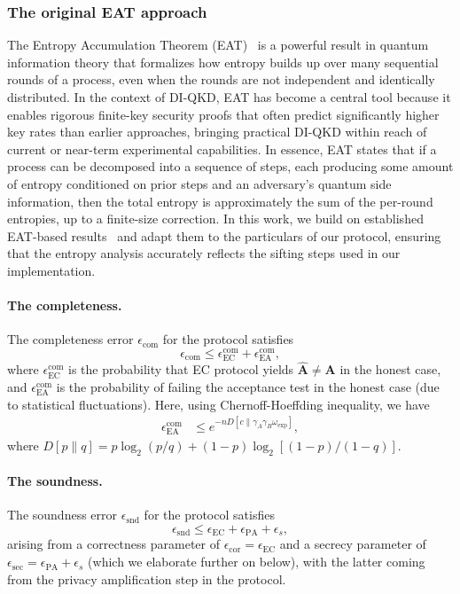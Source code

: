 \documentclass[aps,reprint,showpacs,superscriptaddress]{revtex4-2}
\begin{document}
\subsubsection{The original EAT approach}

The Entropy Accumulation Theorem (EAT)~\cite{DFR20} is a powerful result in quantum information theory that formalizes how entropy builds up over many sequential rounds of a process, even when the rounds are not independent and identically distributed.
In the context of DI-QKD, EAT has become a central tool because it enables rigorous finite-key security proofs that often predict significantly higher key rates than earlier approaches, bringing practical DI-QKD within reach of current or near-term experimental capabilities.
In essence, EAT states that if a process can be decomposed into a sequence of steps, each producing some amount of entropy conditioned on prior steps and an adversary's quantum side information, then the total entropy is approximately the sum of the per-round entropies, up to a finite-size correction.
In this work, we build on established EAT-based results~\cite{arnon2018practical,TSB+22} and adapt them to the particulars of our protocol, ensuring that the entropy analysis accurately reflects the sifting steps used in our implementation.

\paragraph{The completeness.} The completeness error $\epsilon_{\mathrm{com}}$ for the protocol satisfies
\begin{equation}
\epsilon_{\mathrm{com}}
\leqslant
\epsilon_{\mathrm{EC}}^{\mathrm{com}}
+\epsilon_{\mathrm{EA}}^{\mathrm{com}},
\end{equation}
where $\epsilon_{\mathrm{EC}}^{\mathrm{com}}$ is the probability that EC protocol yields $\hat{\mathbf{A}}\neq\mathbf{A}$ in the honest case,
and $\epsilon_{\mathrm{EA}}^{\mathrm{com}}$ is the probability of failing the acceptance test in the honest case (due to statistical fluctuations).
Here, using Chernoff-Hoeffding inequality, we have
\begin{align}
\epsilon_{\mathrm{EA}}^{\mathrm{com}} & \leqslant e^{-nD\left[c\|\gamma_{A}\gamma_{B}\omega_{\mathrm{exp}}\right]},
\end{align}
where $D[p\|q]=p\log_{2}(p/q)+(1-p)\log_{2}[(1-p)/(1-q)]$.

\paragraph{The soundness.} The soundness error $\epsilon_{\mathrm{snd}}$ for the protocol satisfies
\begin{equation}
\epsilon_{\mathrm{snd}}\leqslant\epsilon_{\mathrm{EC}}+\epsilon_{\mathrm{PA}}+\epsilon_{s},
\end{equation}
arising from a correctness parameter of $\epsilon_{\mathrm{cor}} = \epsilon_{\mathrm{EC}}$ and a secrecy parameter of $\epsilon_{\mathrm{sec}} = \epsilon_{\mathrm{PA}}+ \epsilon_{s}$ (which we elaborate further on below), with the latter coming from the
privacy amplification step in the protocol.
\end{document}
